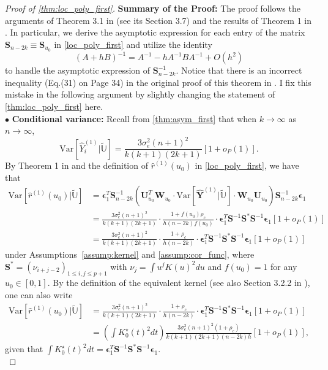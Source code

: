 \documentclass{uwstat572}
\theoremstyle{definition}
\renewcommand{\hat}{\widehat}
\renewcommand{\tilde}{\widetilde}
\theoremstyle{theorem}
\begin{document}
\begin{proof}[Proof of \autoref{thm:loc_poly_first}]
{\bf Summary of the Proof:} The proof follows the arguments of Theorem 3.1 in \cite{fan1996local} (see its Section 3.7) and the results of Theorem 1 in \cite{de2018local}. In particular, we derive the asymptotic expression for each entry of the matrix $\bm{S}_{n-2k}\equiv \bm{S}_{u_0}$ in \eqref{loc_poly_first} and utilize the identity
$$(A+hB)^{-1} = A^{-1} - hA^{-1} B A^{-1} + O(h^2)$$
to handle the asymptotic expression of $\bm{S}_{n-2k}^{-1}$. Notice that there is an incorrect inequality (Eq.(31) on Page 34) in the original proof of this theorem in \cite{liu2020smoothed}. I fix this mistake in the following argument by slightly changing the statement of \autoref{thm:loc_poly_first} here.\\

$\bullet$ {\bf Conditional variance:} Recall from \autoref{thm:asym_first} that when $k\to \infty$ as $n\to\infty$, 
$$\mathrm{Var}\left[\hat{Y}_i^{(1)} \big| \tilde{\mathbb{U}}\right] = \frac{3\sigma_e^2 (n+1)^2}{k(k+1)(2k+1)}\left[1+ o_P(1)\right].$$
By Theorem 1 in \cite{de2018local} and the definition of $\hat{r}^{(1)}(u_0)$ in \eqref{loc_poly_first}, we have that
\begin{align*}
\mathrm{Var}\left[\hat{r}^{(1)}(u_0) \big| \tilde{\mathbb{U}}\right] &= \bm{\epsilon}_1^T \bm{S}_{n-2k}^{-1} \left(\bm{U}_{u_0}^T \bm{W}_{u_0} \cdot \mathrm{Var}\left[\hat{\bm{Y}}^{(1)} \big| \tilde{\mathbb{U}}\right] \cdot \bm{W}_{u_0} \bm{U}_{u_0}\right) \bm{S}_{n-2k}^{-1} \bm{\epsilon}_1\\
&= \frac{3\sigma_e^2 (n+1)^2}{k(k+1)(2k+1)} \cdot \frac{1 + f(u_0)\rho_c}{h(n-2k) f(u_0)}\cdot \bm{\epsilon}_1^T \bm{S}^{-1} \bm{S}^* \bm{S}^{-1} \bm{\epsilon}_1\left[1+ o_P(1)\right]\\
&= \frac{3\sigma_e^2 (n+1)^2}{k(k+1)(2k+1)} \cdot \frac{1 + \rho_c}{h(n-2k)}\cdot \bm{\epsilon}_1^T \bm{S}^{-1} \bm{S}^* \bm{S}^{-1} \bm{\epsilon}_1\left[1+ o_P(1)\right]
\end{align*}
under Assumptions~\ref{assump:kernel} and \ref{assump:cor_func}, where  $\bm{S}^*=\left(\nu_{i+j-2}\right)_{1\leq i,j\leq p+1}$ with $\nu_j = \int u^j K(u)^2 du$ and $f(u_0)=1$ for any $u_0\in [0,1]$. By the definition of the equivalent kernel (see also Section 3.2.2 in \citealt{fan1996local}), one can also write
\begin{align*}
\mathrm{Var}\left[\hat{r}^{(1)}(u_0) \big| \tilde{\mathbb{U}}\right] &= \frac{3\sigma_e^2 (n+1)^2}{k(k+1)(2k+1)} \cdot \frac{1 + \rho_c}{h(n-2k)}\cdot \bm{\epsilon}_1^T \bm{S}^{-1} \bm{S}^* \bm{S}^{-1} \bm{\epsilon}_1\left[1+ o_P(1)\right] \\
&= \left(\int K_0^{\star}(t)^2 dt \right) \frac{3\sigma_e^2 (n+1)^2 (1+\rho_c)}{k(k+1)(2k+1) (n-2k) h} \left[1+o_P(1)\right],
\end{align*}
given that $\int K_0^{\star}(t)^2 dt = \bm{\epsilon}_1^T \bm{S}^{-1}\bm{S}^* \bm{S}^{-1} \bm{\epsilon}_1$.\\


\end{proof}
\end{document}
